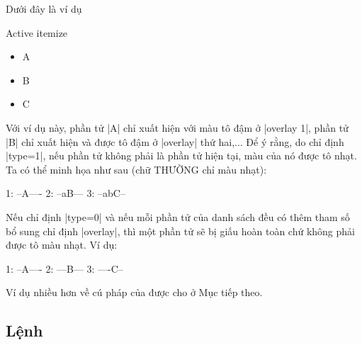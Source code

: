 Dưới đây là ví dụ
\begin{example}
 \begin{slide}{Active itemize}
   \begin{itemize}[type=1]
    \item<1> A
    \item<2> B
    \item<3> C
   \end{itemize}
 \end{slide}
\end{example}
Với ví dụ này, phần tử |A| chỉ xuất hiện với màu tô đậm ở |overlay 1|,
phần tử |B| chỉ xuất hiện và được tô đậm ở |overlay| thứ hai,... Để ý rằng,
do chỉ định |type=1|, nếu phần tử không phải là phần tử hiện tại,
màu của nó được tô nhạt. Ta có thể minh họa như sau (chữ THƯỜNG chỉ màu nhạt):
\begin{example}
  1: --A---- 
  2: --aB--- 
  3: --abC--
\end{example}
Nếu chỉ định |type=0| và nếu mỗi phần tử của danh sách đều có thêm
tham số bổ sung chỉ định |overlay|, thì một phần tử sẽ bị giấu
hoàn toàn chứ không phải được tô màu nhạt. Ví dụ:
\begin{example}
  1: --A---- 
  2: ---B--- 
  3: ----C--
\end{example}

Ví dụ nhiều hơn về cú pháp của  được cho ở Mục tiếp theo.


\subsection{\texorpdfstring{Lệnh}{Lenh} }
\label{sec:onslide}

